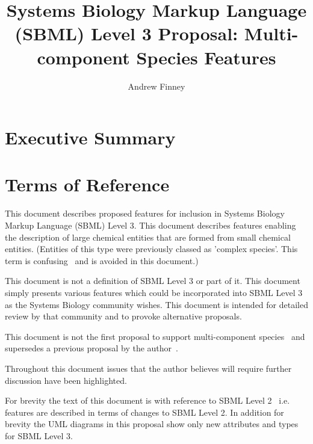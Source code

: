 \documentclass{cekarticle}
\begin{document}

\title{Systems Biology Markup Language (SBML) Level 3 Proposal: Multi-component Species Features}

\author{Andrew Finney}


\maketitlepage

\section{Executive Summary}
\label{Executive Summary}

\section{Terms of Reference}
\label{sec:t-o-r}

This document describes proposed features for inclusion in
Systems Biology Markup Language (SBML) Level 3. This document
describes features enabling the description of large chemical entities that are formed
from small chemical entities.  (Entities of this type were previously classed as 'complex species'.
This term is confusing~\citep{phair:2003} and is avoided in this document.)  

This document is not a definition of SBML Level 3 or part of it.
This document simply presents various features which could be
incorporated into SBML Level 3 as the Systems Biology community
wishes.  This document is intended for detailed review by that
community and to provoke alternative proposals.  

This document is not the first proposal to support multi-component species~\citep{lenovere:2002} and supersedes
a previous proposal by the author~\citep{finney:2001f}.

Throughout this
document issues that the author believes will require further
discussion have been highlighted.

For brevity the text of this document is with reference to SBML
Level 2~\citep{finney:2002f} i.e. features are described in terms
of changes to SBML Level 2.  In addition for brevity the UML diagrams in this proposal
show only new attributes and types for SBML Level 3.  
\end{document}
